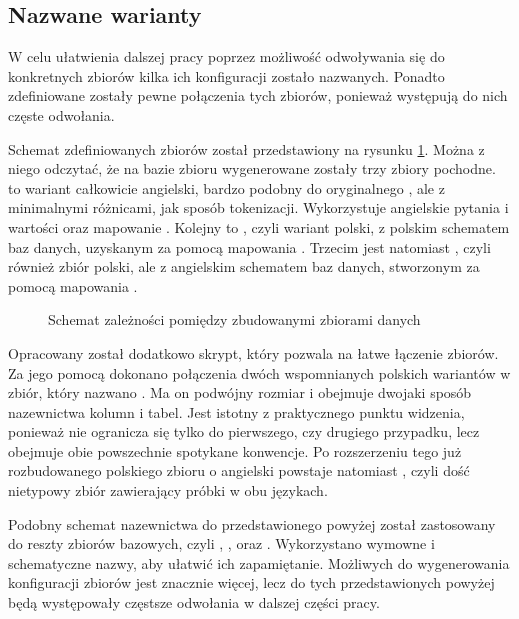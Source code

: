 \subsection{Nazwane warianty}

W celu ułatwienia dalszej pracy poprzez możliwość odwoływania się do konkretnych zbiorów kilka ich konfiguracji zostało nazwanych. Ponadto zdefiniowane zostały pewne połączenia tych zbiorów, ponieważ występują do nich częste odwołania.

Schemat zdefiniowanych zbiorów został przedstawiony na rysunku \ref{fig:datasets}. Można z niego odczytać, że na bazie zbioru  wygenerowane zostały trzy zbiory pochodne.  to wariant całkowicie angielski, bardzo podobny do oryginalnego , ale z minimalnymi różnicami, jak sposób tokenizacji. Wykorzystuje angielskie pytania i wartości oraz mapowanie . Kolejny to , czyli wariant polski, z polskim schematem baz danych, uzyskanym za pomocą mapowania . Trzecim jest natomiast \mbox{}, czyli również zbiór polski, ale z angielskim schematem baz danych, stworzonym za pomocą mapowania .

\begin{figure}[ht!]
  \centering
  
  \caption{Schemat zależności pomiędzy zbudowanymi zbiorami danych}
  \label{fig:datasets}
\end{figure}

Opracowany został dodatkowo skrypt, który pozwala na łatwe łączenie zbiorów. Za jego pomocą dokonano połączenia dwóch wspomnianych polskich wariantów w zbiór, który nazwano . Ma on podwójny rozmiar i obejmuje dwojaki sposób nazewnictwa kolumn i tabel. Jest istotny z praktycznego punktu widzenia, ponieważ nie ogranicza się tylko do pierwszego, czy drugiego przypadku, lecz obejmuje obie powszechnie spotykane konwencje. Po rozszerzeniu tego już rozbudowanego polskiego zbioru o angielski  powstaje natomiast , czyli dość nietypowy zbiór zawierający próbki w obu językach.

Podobny schemat nazewnictwa do przedstawionego powyżej został zastosowany do reszty zbiorów bazowych, czyli , ,  oraz . Wykorzystano wymowne i schematyczne nazwy, aby ułatwić ich zapamiętanie. Możliwych do wygenerowania konfiguracji zbiorów jest znacznie więcej, lecz do tych przedstawionych powyżej będą występowały częstsze odwołania w dalszej części pracy.
